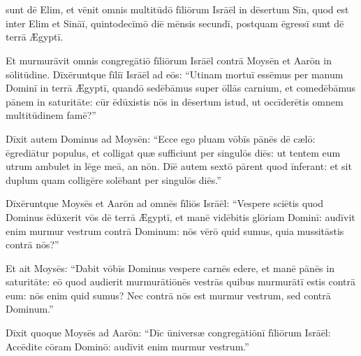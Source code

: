 \chapter{}


\thispagestyle{empty}

 sunt dē Elim, et vēnit omnis multitūdō fīliōrum
Isrāēl in dēsertum Sīn, quod est inter Elim et Sināī,
quintodecīmō diē mēnsis secundī, postquam ēgressī sunt dē terrā Ægyptī.

Et murmurāvit omnis congregātiō fīliōrum
Isrāēl contrā Moysēn et Aarōn in sōlitūdine. Dīxēruntque fīliī Isrāēl ad eōs:
``Utinam mortuī essēmus per manum Dominī in terrā Ægyptī, quandō sedēbāmus
super ōllās carnium, et comedēbāmus pānem in saturitāte: cūr ēdūxistis nōs in
dēsertum istud, ut occīderētis omnem multitūdinem famē?''

Dīxit autem
Dominus ad Moysēn: ``Ecce ego pluam vōbīs pānēs
dē cælō: ēgrediātur populus, et colligat quæ
sufficiunt per singulōs diēs: ut
tentem eum utrum ambulet in lēge meā, an nōn. Dīē autem
sextō pārent quod īnferant: et sit duplum
quam colligēre solēbant per singulōs diēs.''

Dīxēruntque Moysēs et Aarōn ad omnēs fīliōs Isrāēl: ``Vespere sciētis
quod Dominus ēdūxerit vōs dē terrā Ægyptī, et manē vidēbitis glōriam
Dominī: audīvit enim murmur vestrum contrā Dominum: nōs
vērō quid sumus, quia mussitāstis contrā nōs?''

Et ait Moysēs: ``Dabit vōbīs Dominus vespere carnēs edere, et manē pānēs in
saturitāte: eō quod audierit murmurātiōnēs
vestrās quibus murmurātī estis contrā eum: nōs enim
quid sumus? Nec contrā nōs est murmur vestrum, sed contrā Dominum.''

Dīxit quoque Moysēs ad Aarōn: ``Dīc ūniversæ congregātiōnī
fīliōrum Isrāēl: Accēdite cōram Dominō: audīvit enim murmur vestrum.''

